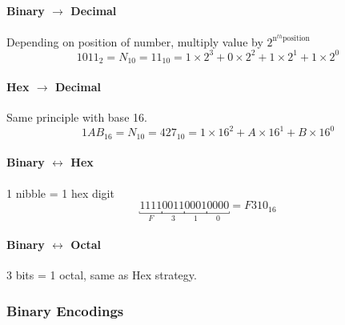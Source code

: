 \documentclass[12 pt]{article}
\begin{document}
	\paragraph{Binary $\to$ Decimal} Depending on position of number, multiply value by $2^{\text{n}^{th} \text{position}}$
	\begin{equation*}
	1011_2=N_{10}=11_{10}=1\times 2^3 + 0 \times 2^2 + 1 \times 2^1 + 1 \times 2^0
	\end{equation*}
	\paragraph{Hex $\to$ Decimal} Same principle with base 16. 
	\begin{equation*}
	1AB_{16}=N_{10}=427_{10}=1\times 16^2 + A \times 16^1 + B \times 16^0
	\end{equation*}
	\paragraph{Binary $\leftrightarrow$ Hex} 1 nibble = 1 hex digit
	\begin{equation*}
	\underbracket{1111}_{F}\underbracket{0011}_{3}\underbracket{0001}_{1}{\underbracket{0000}_{0}}=F310_{16}
	\end{equation*}
	\paragraph{Binary $\leftrightarrow$ Octal} 3 bits = 1 octal, same as Hex strategy.
	\subsubsection{Binary Encodings}
\end{document}
